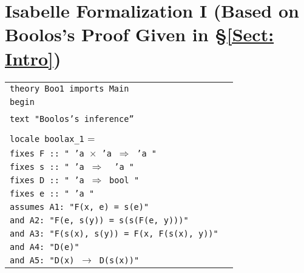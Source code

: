 \documentclass[11pt,a4paper]{article}
\newcommand{\bt}[2]{\small \begin{center}\begin{tabular}{p{#1 cm}p{#2 cm}}}
\def\et{\end{tabular}\end{center}\normalsize}
\theoremstyle{definition}
\begin{document}
\section{Isabelle Formalization I (Based on Boolos's Proof Given in \S \ref{Sect: Intro})}\label{Sect: Isabelle I}


\bt{14}{0}
\texttt{theory Boo1 imports Main}\\
\texttt{begin}\\
\\
\texttt{text "Boolos's inference''}\\
\\
\texttt{locale boolax\_1} = \\
\hspace{3mm} \texttt{fixes F :: " 'a $\times$  'a $\Rightarrow$  'a "}\\
\hspace{3mm} \texttt{fixes s :: " 'a $\Rightarrow$ \ 'a "} \\
\hspace{3mm}  \texttt{fixes D :: " 'a $\Rightarrow$ bool "} \\
\hspace{3mm}  \texttt{fixes e ::  " 'a "} \\
\hspace{3mm}  \texttt{assumes A1: "F(x, e) = s(e)"} \\
\hspace{3mm}  \texttt{and  A2:  "F(e, s(y)) = s(s(F(e, y)))"}  \\
\hspace{3mm}  \texttt{and  A3: "F(s(x), s(y)) = F(x, F(s(x), y))"} \\
\hspace{3mm}  \texttt{and  A4:  "D(e)"} \\
\hspace{3mm}  \texttt{and A5: "D(x) $\longrightarrow$ D(s(x))"}
\et
\end{document}
